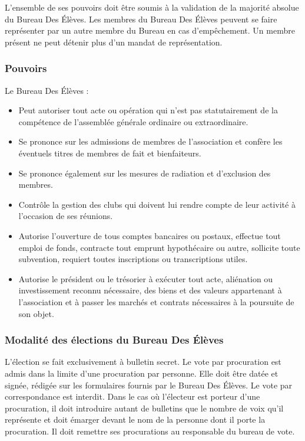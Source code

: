 \documentclass{article} %
\begin{document}
				L’ensemble de ses pouvoirs doit être soumis à la validation de la
				majorité absolue du Bureau Des Élèves. Les membres du Bureau Des
				Élèves peuvent se faire représenter par un autre membre du Bureau en
				cas d’empêchement. Un membre présent ne peut détenir plus d’un mandat
				de représentation.

			\subsubsection{Pouvoirs}
				Le Bureau Des Élèves :
				\begin{itemize}
					\item Peut autoriser tout acte ou opération qui n’est pas
					    statutairement de la compétence de l’assemblée générale
					    ordinaire ou extraordinaire.
					\item Se prononce sur les admissions de membres de l’association
					    et confère les éventuels titres de membres de fait et
    					bienfaiteurs.
					\item Se prononce également sur les mesures de radiation et
	    				d’exclusion des membres.
					\item Contrôle la gestion des clubs qui doivent lui rendre compte
		    			de leur activité à l’occasion de ses réunions.
					\item Autorise l’ouverture de tous comptes bancaires ou postaux,
					    effectue tout emploi de fonds, contracte tout emprunt
					    hypothécaire ou autre, sollicite toute subvention, requiert
					    toutes inscriptions ou transcriptions utiles.
					\item Autorise le président ou le trésorier à exécuter tout acte,
					    aliénation ou investissement reconnu nécessaire, des biens et
					    des valeurs appartenant à l’association et à passer les
					    marchés et contrats nécessaires à la poursuite de son objet.
				\end{itemize}

			\subsubsection{Modalité des élections du Bureau Des Élèves}
				L’élection se fait exclusivement à bulletin secret. Le vote par
				procuration est admis dans la limite d’une procuration par personne.
				Elle doit être datée et signée, rédigée sur les formulaires fournis
				par le Bureau Des Élèves. Le vote par correspondance est interdit.
				Dans le cas où l’électeur est porteur d’une procuration, il doit
				introduire autant de bulletins que le nombre de voix qu’il représente
				et doit émarger devant le nom de la personne dont il porte la
				procuration. Il doit remettre ses procurations au responsable du
				bureau de vote.
				
\end{document}
